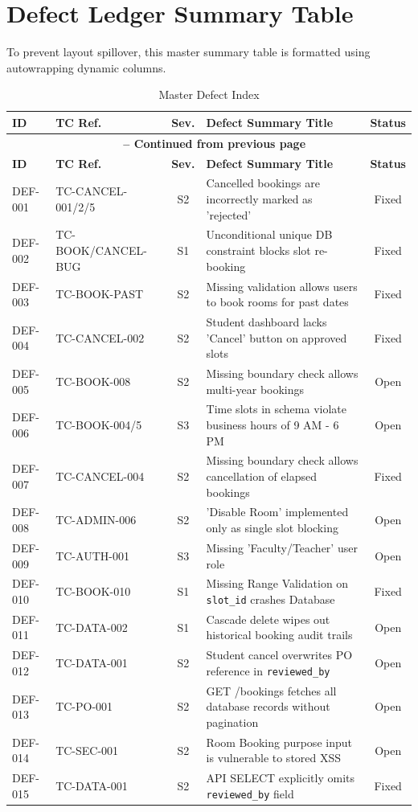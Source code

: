 \documentclass[11pt,a4paper]{article}
\begin{document}
\newpage
\section{Defect Ledger Summary Table}
To prevent layout spillover, this master summary table is formatted using autowrapping dynamic columns.

\begin{center}
\begin{longtable}{@{}llcp{6.5cm}c@{}}
\caption{Master Defect Index} \label{tab:defect_index} \\
\toprule
\textbf{ID} & \textbf{TC Ref.} & \textbf{Sev.} & \textbf{Defect Summary Title} & \textbf{Status} \\ \midrule
\endfirsthead
\multicolumn{5}{c}{{\bfseries \tablename\ \thetable{} -- Continued from previous page}} \\
\toprule
\textbf{ID} & \textbf{TC Ref.} & \textbf{Sev.} & \textbf{Defect Summary Title} & \textbf{Status} \\ \midrule
\endhead
\bottomrule
\endfoot
\bottomrule
\endlastfoot

DEF-001 & TC-CANCEL-001/2/5 & S2 & Cancelled bookings are incorrectly marked as 'rejected' & Fixed \\
DEF-002 & TC-BOOK/CANCEL-BUG & S1 & Unconditional unique DB constraint blocks slot re-booking & Fixed \\
DEF-003 & TC-BOOK-PAST & S2 & Missing validation allows users to book rooms for past dates & Fixed \\
DEF-004 & TC-CANCEL-002 & S2 & Student dashboard lacks 'Cancel' button on approved slots & Fixed \\
DEF-005 & TC-BOOK-008 & S2 & Missing boundary check allows multi-year bookings & Open \\
DEF-006 & TC-BOOK-004/5 & S3 & Time slots in schema violate business hours of 9 AM - 6 PM & Open \\
DEF-007 & TC-CANCEL-004 & S2 & Missing boundary check allows cancellation of elapsed bookings & Fixed \\
DEF-008 & TC-ADMIN-006 & S2 & 'Disable Room' implemented only as single slot blocking & Open \\
DEF-009 & TC-AUTH-001 & S3 & Missing 'Faculty/Teacher' user role & Open \\
DEF-010 & TC-BOOK-010 & S1 & Missing Range Validation on \texttt{slot\_id} crashes Database & Fixed \\
DEF-011 & TC-DATA-002 & S1 & Cascade delete wipes out historical booking audit trails & Open \\
DEF-012 & TC-DATA-001 & S2 & Student cancel overwrites PO reference in \texttt{reviewed\_by} & Open \\
DEF-013 & TC-PO-001 & S2 & GET /bookings fetches all database records without pagination & Open \\
DEF-014 & TC-SEC-001 & S2 & Room Booking purpose input is vulnerable to stored XSS & Open \\
DEF-015 & TC-DATA-001 & S2 & API SELECT explicitly omits \texttt{reviewed\_by} field & Fixed \\
\end{longtable}
\end{center}
\end{document}
